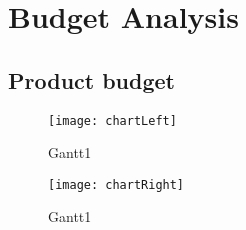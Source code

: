 \chapter{Budget Analysis}
\label{ch:budget}
	
	\section{Product budget}

		\begin{figure}[h]
			\centering
		    	\texttt{[image: chartLeft]}
	  		\caption{Gantt1}
			\label{fig:x}
		\end{figure}
		\begin{figure}[h]
			\centering
		    	\texttt{[image: chartRight]}
	  		\caption{Gantt1}
			\label{fig:x}
		\end{figure}